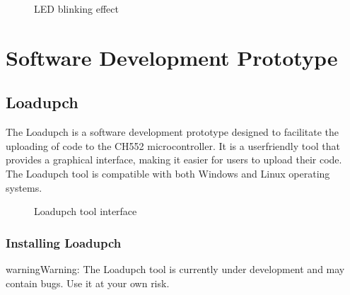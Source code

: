 \documentclass[letterpaper,10pt,english]{sphinxmanual}
\begin{document}
\begin{figure}[htbp]
\centering
\capstart

\noindent{}
\caption{LED blinking effect}\label{\detokenize{compile:id3}}\label{\detokenize{compile:led}}\end{figure}


\chapter{Software Development Prototype}
\label{\detokenize{compile:software-development-prototype}}

\section{Loadupch}
\label{\detokenize{compile:loadupch}}
\sphinxAtStartPar
The Loadupch is a software development prototype designed to facilitate the uploading of code to the CH552 microcontroller. It is a user\sphinxhyphen{}friendly tool that provides a graphical interface, making it easier for users to upload their code. The Loadupch tool is compatible with both Windows and Linux operating systems.

\begin{figure}[htbp]
\centering
\capstart

\noindent{}
\caption{Loadupch tool interface}\label{\detokenize{compile:id4}}\label{\detokenize{compile:id1}}\end{figure}


\subsection{Installing Loadupch}
\label{\detokenize{compile:installing-loadupch}}
\begin{sphinxadmonition}{warning}{Warning:}
\sphinxAtStartPar
The Loadupch tool is currently under development and may contain bugs. Use it at your own risk.
\end{sphinxadmonition}
\end{document}
